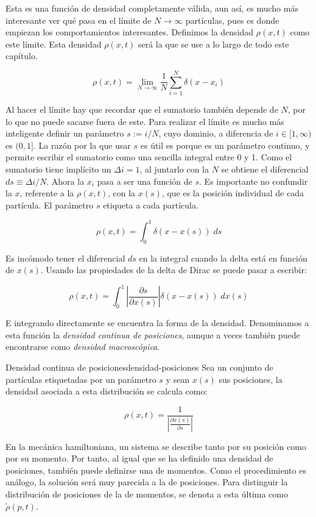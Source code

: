 Esta es una función de densidad completamente válida, aun así, es mucho más interesante ver qué pasa en el límite de $N\to\infty$ partículas, pues es donde empiezan los comportamientos interesantes. Definimos la densidad $\rho(x,t)$ como este límite. Esta densidad $\rho(x,t)$ será la que se use a lo largo de todo este capítulo.

\[\rho(x,t)=\lim_{N\to\infty}\frac1N\sum_{i=1}^N\delta(x-x_i)\]

Al hacer el límite hay que recordar que el sumatorio también depende de $N$, por lo que no puede sacarse fuera de este. Para realizar el límite es mucho más inteligente definir un parámetro $s:=i/N$, cuyo dominio, a diferencia de $i\in[1,\infty)$ es $(0,1]$. La razón por la que usar $s$ es útil es porque es un parámetro continuo, y permite escribir el sumatorio como una sencilla integral entre 0 y 1. Como el sumatorio tiene implícito un $\Delta i=1$, al juntarlo con la $N$ se obtiene el diferencial $ds\equiv\Delta i/N$. Ahora la $x_i$ pasa a ser una función de $s$. Es importante no confundir la $x$, referente a la $\rho(x,t)$, con la $x(s)$, que es la posición individual de cada partícula. El parámetro $s$ etiqueta a cada partícula.

\[\rho(x,t)=\int_0^1\delta(x-x(s))\;ds\]

Es incómodo tener el diferencial $ds$ en la integral cuando la delta está en función de $x(s)$. Usando las propiedades de la delta de Dirac se puede pasar a escribir:

\[\rho(x,t)=\int_0^1\left|\frac{\partial s}{\partial x(s)}\right|\delta(x-x(s))\;dx(s)\]

E integrando directamente se encuentra la forma de la densidad. Denominamos a esta función la \textit{densidad continua de posiciones}, aunque a veces también puede encontrarse como \textit{densidad macroscópica}.

\begin{definicion}{Densidad continua de posiciones}{densidad-posiciones}
Sea un conjunto de partículas etiquetadas por un parámetro $s$ y sean $x(s)$ sus posiciones, la densidad asociada a esta distribución se calcula como:

\[\rho(x,t)=\frac1{\left|\frac{\partial x(s)}{\partial s}\right|}\]
\end{definicion}

 En la mecánica hamiltoniana, un sistema se describe tanto por su posición como por su momento. Por tanto, al igual que se ha definido una densidad de posiciones, también puede definirse una de momentos. Como el procedimiento es análogo, la solución será muy parecida a la de posiciones. Para distinguir la distribución de posiciones de la de momentos, se denota a esta última como $\tilde\rho(p,t)$.

